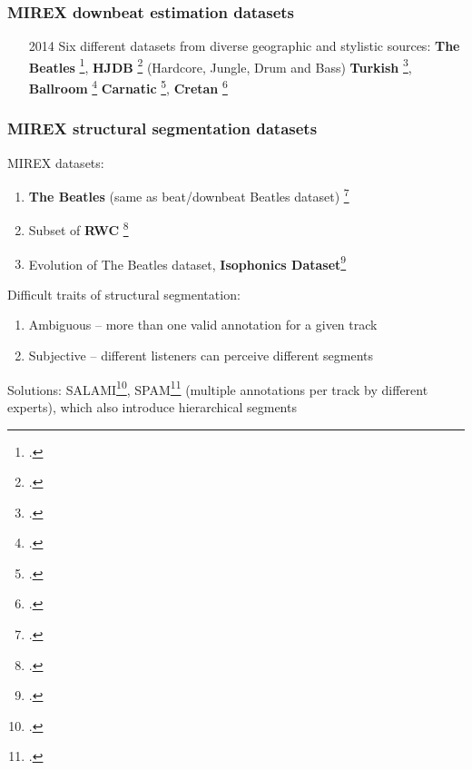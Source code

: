 \documentclass{beamer}
\begin{document}

\begin{frame}
	\frametitle{MIREX downbeat estimation datasets}
	\begin{enumerate}
		\item[2014]
			Six different datasets from diverse geographic and stylistic sources:
			\textbf{The Beatles} \footcite{beatles}, \textbf{HJDB} \footcite{hjdb} (Hardcore, Jungle, Drum and Bass)
			\textbf{Turkish} \footcite{turkish}, \textbf{Ballroom} \footcite{ballroom}
			\textbf{Carnatic} \footcite{carnatic}, \textbf{Cretan} \footcite{cretan}
	\end{enumerate}
\end{frame}


\begin{frame}
	\frametitle{MIREX structural segmentation datasets}
	MIREX datasets:
	\begin{enumerate}
		\item
			\textbf{The Beatles} (same as beat/downbeat Beatles dataset) \footcite{beatles}
		\item
			Subset of \textbf{RWC} \footcite{rwc}
		\item
			Evolution of The Beatles dataset, \textbf{Isophonics Dataset}\footcite{isophonics}
	\end{enumerate}
	Difficult traits of structural segmentation:
	\begin{enumerate}
		\item
			Ambiguous -- more than one valid annotation for a given track
		\item
			Subjective -- different listeners can perceive different segments
	\end{enumerate}
	Solutions: SALAMI\footcite{salami}, SPAM\footcite{spam} (multiple annotations per track by different experts), which also introduce hierarchical segments
\end{frame}
\end{document}
